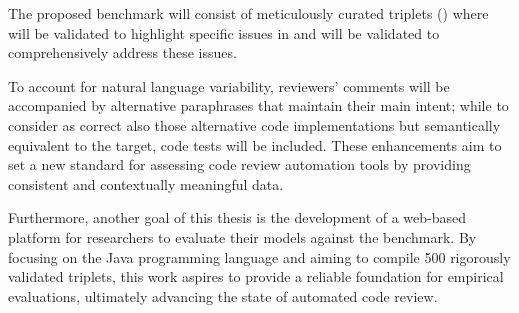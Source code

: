 The proposed benchmark will consist of meticulously curated triplets (\subCode)
where \revComment will be validated to highlight specific issues in \subCode and
\revCode will be validated to comprehensively address these issues.

To account for natural language variability, reviewers' comments will be accompanied by
alternative paraphrases that maintain their main intent; while to consider as correct also
those alternative code implementations but semantically equivalent to the target, code tests will
be included. These enhancements aim to set a new standard for assessing code review
automation tools by providing consistent and contextually meaningful data.

Furthermore, another goal of this thesis is the development of a web-based platform for researchers to
evaluate their models against the benchmark. By focusing on the Java
programming language and aiming to compile 500 rigorously validated triplets,
this work aspires to provide a reliable foundation for empirical evaluations,
ultimately advancing the state of automated code review.
